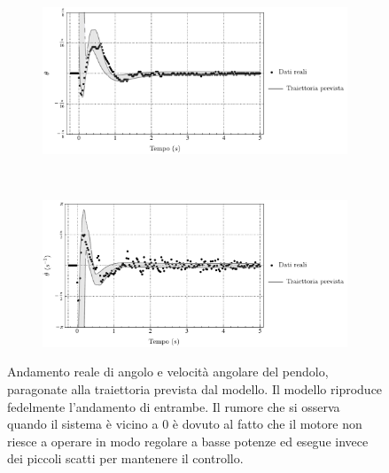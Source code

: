 \begin{figure}
    \centering
    \begin{subfigure}[]{\textwidth}
        \centering
        \includegraphics[width=\textwidth]{assets/a-plot}
    \end{subfigure}
    \\[5ex]
    \begin{subfigure}[]{\textwidth}
        \centering
        \includegraphics[width=\textwidth]{assets/w-plot}
    \end{subfigure}

    \caption[Resistenza alle perturbazioni: angolo e velocità angolare]{
        Andamento reale di angolo e velocità angolare del pendolo,
        paragonate alla traiettoria prevista dal modello.
        Il modello riproduce fedelmente l'andamento di entrambe.
        Il rumore che si osserva quando il sistema è vicino a $0$
        è dovuto al fatto che il motore non riesce a operare in modo
        regolare a basse potenze ed esegue invece dei piccoli
        scatti per mantenere il controllo.
    }
    \label{fig:swag2}
\end{figure}